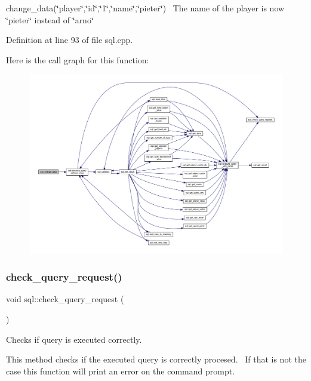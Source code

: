 change\+\_\+data(\char`\"{}player\char`\"{},\char`\"{}id\char`\"{},\char`\"{}1\char`\"{},\char`\"{}name\char`\"{},\char`\"{}pieter\char`\"{})~\newline
The name of the player is now \char`\"{}pieter\char`\"{} instead of \char`\"{}arno\char`\"{} 

Definition at line 93 of file sql.\+cpp.

Here is the call graph for this function\+:
\nopagebreak
\begin{figure}[H]
\begin{center}
\leavevmode
\includegraphics[width=350pt]{classsql_aa6a8501373e0cd73d48bee389353d6ea_cgraph}
\end{center}
\end{figure}
\mbox{\label{classsql_a4bdab1846b3789ddd83521d5eec019b5}} 
\subsubsection{\texorpdfstring{check\+\_\+query\+\_\+request()}{check\_query\_request()}}
{\footnotesize\ttfamily void sql\+::check\+\_\+query\+\_\+request (\begin{DoxyParamCaption}{ }\end{DoxyParamCaption})\hspace{0.3cm}{\ttfamily [private]}}



Checks if query is executed correctly. 

This method checks if the executed query is correctly procesed.~\newline
If that is not the case this function will print an error on the command prompt.~\newline



